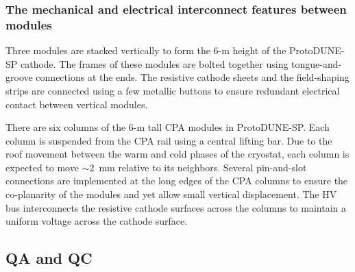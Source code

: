 \subsubsection{The mechanical and electrical interconnect features between modules}

Three modules are stacked vertically to form the 6-m height of the ProtoDUNE-SP  cathode.  The frames of these modules are bolted together using tongue-and-groove connections at the ends. The resistive cathode sheets and the field-shaping strips are connected using a few metallic buttons to ensure redundant electrical contact between vertical modules.

There are six columns of the 6-m tall CPA modules in  ProtoDUNE-SP.  Each column is suspended from the CPA rail using a central lifting bar.  Due to the  roof movement between the warm and cold phases of the cryostat, each column is expected to move $\sim$2~mm relative to its neighbors.  Several pin-and-slot connections are implemented at the long edges of the CPA columns to ensure the co-planarity of the modules and yet allow small vertical displacement.  The HV bus interconnects the resistive cathode surfaces across the columns to maintain a uniform voltage across the cathode surface.

\subsection{QA and QC}


